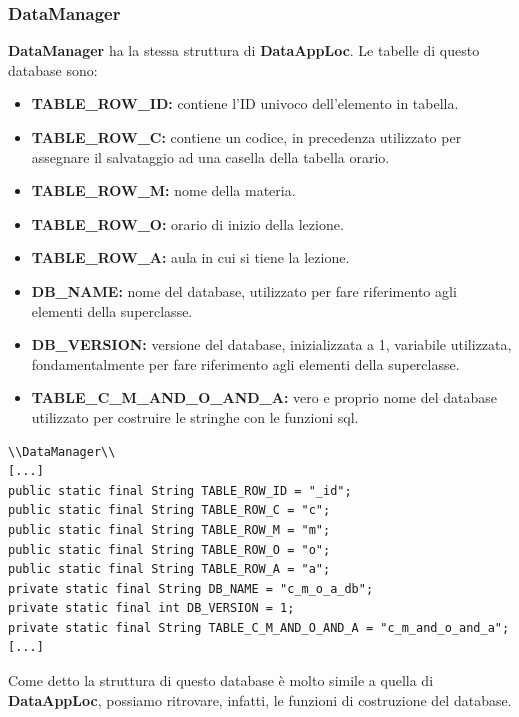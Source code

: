 \documentclass[a4paper, 50pt, twoside]{article}
\begin{document}
\subsubsection{DataManager}
\textbf{DataManager} ha la stessa struttura di \textbf{DataAppLoc}.
Le tabelle di questo database sono:
\begin{itemize}
\item \textbf{TABLE\_ROW\_ID:} contiene l'ID univoco dell'elemento in tabella.
\item \textbf{TABLE\_ROW\_C:} contiene un codice, in precedenza utilizzato per assegnare il salvataggio ad una casella della tabella orario.
\item \textbf{TABLE\_ROW\_M:} nome della materia.
\item \textbf{TABLE\_ROW\_O:} orario di inizio della lezione.
\item \textbf{TABLE\_ROW\_A:} aula in cui si tiene la lezione.
\item \textbf{DB\_NAME:} nome del database, utilizzato per fare riferimento agli elementi della superclasse.
\item \textbf{DB\_VERSION:} versione del database, inizializzata a 1, variabile utilizzata, fondamentalmente per fare riferimento agli elementi della superclasse.
\item \textbf{TABLE\_C\_M\_AND\_O\_AND\_A:} vero e proprio nome del database utilizzato per costruire le stringhe con le funzioni sql.
\end{itemize}

\begin{lstlisting}
\\DataManager\\
[...]
public static final String TABLE_ROW_ID = "_id";
public static final String TABLE_ROW_C = "c";
public static final String TABLE_ROW_M = "m";
public static final String TABLE_ROW_O = "o";
public static final String TABLE_ROW_A = "a";
private static final String DB_NAME = "c_m_o_a_db";
private static final int DB_VERSION = 1;
private static final String TABLE_C_M_AND_O_AND_A = "c_m_and_o_and_a";
[...]
\end{lstlisting}

Come detto la struttura di questo database è molto simile a quella di \textbf{DataAppLoc}, possiamo ritrovare, infatti, le funzioni di costruzione del database.
\end{document}
